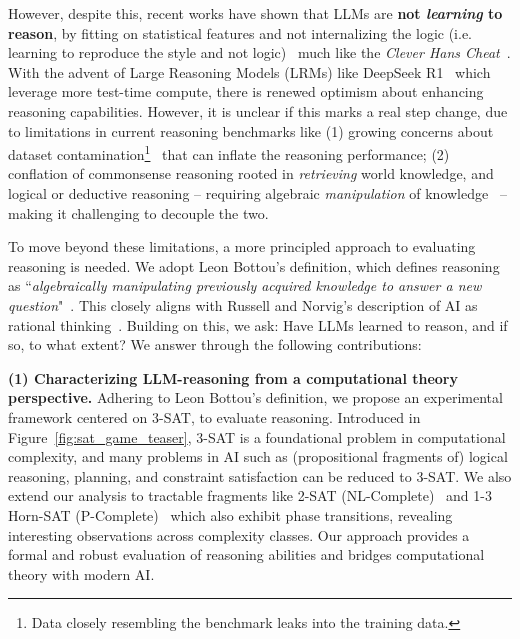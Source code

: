 \documentclass{article} %
\begin{document}
However, despite this, recent works have shown that LLMs are \textbf{not \emph{learning} to reason}, by fitting on statistical features and not internalizing the logic (i.e. learning to reproduce the style and not logic)~\citep{paradox_of_learning_to_reason} much like the \emph{Clever Hans Cheat}~\citep{pitfalls_of_next_token_prediction}. With the advent of Large Reasoning Models (LRMs) like DeepSeek R1~\citep{deepseek_r1} which leverage more test-time compute, there is renewed optimism about enhancing reasoning capabilities. However, it is unclear if this marks a real step change, due to limitations in current reasoning benchmarks like (1) growing concerns about dataset contamination\footnote{Data closely resembling the benchmark leaks into the training data.}~\citep{zhang2024careful} that can inflate the reasoning performance; (2) conflation of commonsense reasoning rooted in \emph{retrieving} world knowledge, and logical or deductive reasoning -- requiring algebraic \emph{manipulation} of knowledge~\citep{logical_foundations_of_ai} -- making it challenging to decouple the two.


To move beyond these limitations, a more principled approach to evaluating reasoning is needed. We adopt Leon Bottou's definition, which defines reasoning as “\emph{algebraically manipulating previously acquired knowledge to answer a new question}"~\citep{bottou2014}. This closely aligns with Russell and Norvig's description of AI as rational thinking~\citep{russel_norvig}.  Building on this, we ask: Have LLMs learned to reason, and if so, to what extent? We answer through the following contributions:

\textbf{(1) Characterizing LLM-reasoning from a computational theory perspective.} Adhering to Leon Bottou's definition, we propose an experimental framework centered on 3-SAT, to evaluate reasoning. Introduced in Figure~\ref{fig:sat_game_teaser}, 3-SAT is a foundational problem in computational complexity, and many
problems in AI such as (propositional fragments of) logical reasoning, planning, and constraint satisfaction can be reduced to 3-SAT. We also extend our analysis to tractable fragments like 2-SAT (NL-Complete)~\citep{2sat_phase_transition} and 1-3 Horn-SAT (P-Complete)~\citep{demopoulos2006phase} which also exhibit phase transitions, revealing interesting observations across complexity classes. Our approach provides a formal and robust evaluation of reasoning abilities and bridges computational theory with modern AI. 
\end{document}
